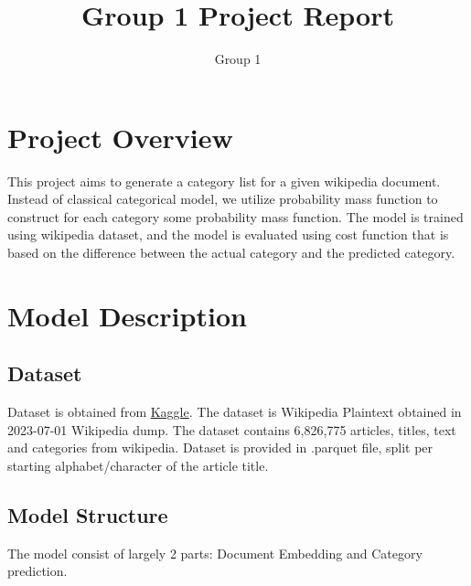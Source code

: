 \documentclass[12pt]{article}
\author{Group 1}
\begin{document}
\title{Group 1 Project Report}
\date{}

\maketitle
\newpage

\tableofcontents

\newpage

\section{Project Overview}
This project aims to generate a category list for a given wikipedia document. Instead of classical categorical model, we utilize probability mass function to construct for each category some probability mass function. The model is trained using wikipedia dataset, and the model is evaluated using cost function that is based on the difference between the actual category and the predicted category.\\

\newpage
\section{Model Description}
\subsection{Dataset}
Dataset is obtained from \href{https://www.kaggle.com/datasets/jjinho/wikipedia-20230701/data}{Kaggle}. The dataset is Wikipedia Plaintext obtained in 2023-07-01 Wikipedia dump. The dataset contains 6,826,775 articles, titles, text and categories from wikipedia. Dataset is provided in .parquet file, split per starting alphabet/character of the article title.

\subsection{Model Structure}
The model consist of largely 2 parts: Document Embedding and Category prediction. 
\end{document}
